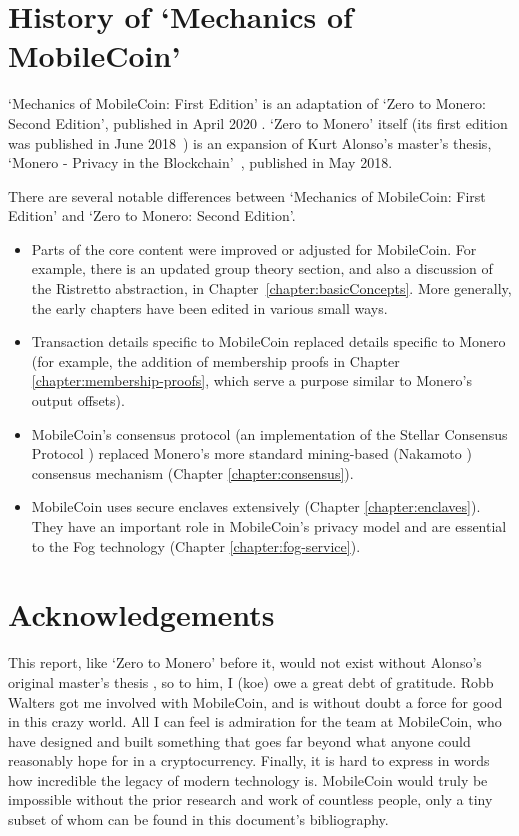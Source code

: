 \section{History of `Mechanics of MobileCoin'}

`Mechanics of MobileCoin: First Edition' is an adaptation of `Zero to Monero: Second Edition', published in April 2020 \cite{ztm-2}. `Zero to Monero' itself (its first edition was published in June 2018~\cite{ztm-1}) is an expansion of Kurt Alonso's master's thesis, `Monero - Privacy in the Blockchain'~\cite{kurt-original}, published in May 2018.

There are several notable differences between `Mechanics of MobileCoin: First Edition' and `Zero to Monero: Second Edition'.

\begin{itemize}
    \item Parts of the core content were improved or adjusted for MobileCoin. For example, there is an updated group theory section, and also a discussion of the Ristretto abstraction, in Chapter~\ref{chapter:basicConcepts}. More generally, the early chapters have been edited in various small ways.
    \item Transaction details specific to MobileCoin replaced details specific to Monero (for example, the addition of membership proofs in Chapter \ref{chapter:membership-proofs}, which serve a purpose similar to Monero's output offsets).
    \item MobileCoin's consensus protocol (an implementation of the Stellar Consensus Protocol \cite{stellar-consensus-protocol}) replaced Monero's more standard mining-based (Nakamoto \cite{Nakamoto_bitcoin}) consensus mechanism (Chapter \ref{chapter:consensus}).
    \item MobileCoin uses secure enclaves extensively (Chapter \ref{chapter:enclaves}). They have an important role in MobileCoin's privacy model and are essential to the Fog technology (Chapter \ref{chapter:fog-service}).
\end{itemize}



\section{Acknowledgements}
\label{sec:acknowledgements}


This report, like `Zero to Monero' before it, would not exist without Alonso's original master's thesis \cite{kurt-original}, so to him, I (koe) owe a great debt of gratitude. Robb Walters got me involved with MobileCoin, and is without doubt a force for good in this crazy world. All I can feel is admiration for the team at MobileCoin, who have designed and built something that goes far beyond what anyone could reasonably hope for in a cryptocurrency. Finally, it is hard to express in words how incredible the legacy of modern technology is. MobileCoin would truly be impossible without the prior research and work of countless people, only a tiny subset of whom can be found in this document's bibliography.